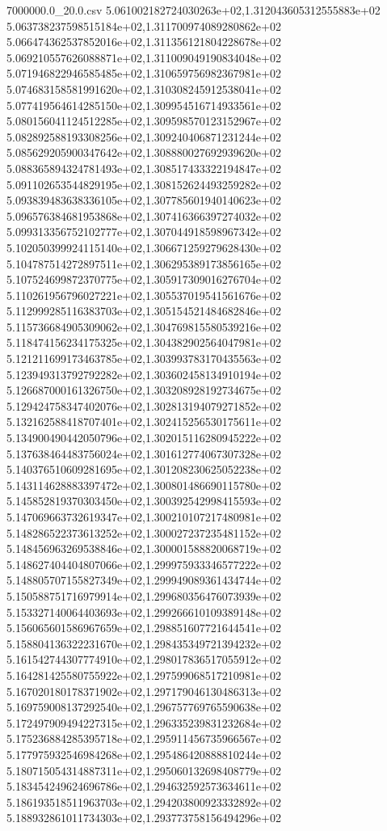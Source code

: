 \begin{filecontents*}{7000000.0_20.0.csv}
5.061002182724030263e+02,1.312043605312555883e+02
5.063738237598515184e+02,1.311700974089280862e+02
5.066474362537852016e+02,1.311356121804228678e+02
5.069210557626088871e+02,1.311009049190834048e+02
5.071946822946585485e+02,1.310659756982367981e+02
5.074683158581991620e+02,1.310308245912538041e+02
5.077419564614285150e+02,1.309954516714933561e+02
5.080156041124512285e+02,1.309598570123152967e+02
5.082892588193308256e+02,1.309240406871231244e+02
5.085629205900347642e+02,1.308880027692939620e+02
5.088365894324781493e+02,1.308517433322194847e+02
5.091102653544829195e+02,1.308152624493259282e+02
5.093839483638336105e+02,1.307785601940140623e+02
5.096576384681953868e+02,1.307416366397274032e+02
5.099313356752102777e+02,1.307044918598967342e+02
5.102050399924115140e+02,1.306671259279628430e+02
5.104787514272897511e+02,1.306295389173856165e+02
5.107524699872370775e+02,1.305917309016276704e+02
5.110261956796027221e+02,1.305537019541561676e+02
5.112999285116383703e+02,1.305154521484682846e+02
5.115736684905309062e+02,1.304769815580539216e+02
5.118474156234175325e+02,1.304382902564047981e+02
5.121211699173463785e+02,1.303993783170435563e+02
5.123949313792792282e+02,1.303602458134910194e+02
5.126687000161326750e+02,1.303208928192734675e+02
5.129424758347402076e+02,1.302813194079271852e+02
5.132162588418707401e+02,1.302415256530175611e+02
5.134900490442050796e+02,1.302015116280945222e+02
5.137638464483756024e+02,1.301612774067307328e+02
5.140376510609281695e+02,1.301208230625052238e+02
5.143114628883397472e+02,1.300801486690115780e+02
5.145852819370303450e+02,1.300392542998415593e+02
5.147069663732619347e+02,1.300210107217480981e+02
5.148286522373613252e+02,1.300027237235481152e+02
5.148456963269538846e+02,1.300001588820068719e+02
5.148627404404807066e+02,1.299975933346577222e+02
5.148805707155827349e+02,1.299949089361434744e+02
5.150588751716979914e+02,1.299680356476073939e+02
5.153327140064403693e+02,1.299266610109389148e+02
5.156065601586967659e+02,1.298851607721644541e+02
5.158804136322231670e+02,1.298435349721394232e+02
5.161542744307774910e+02,1.298017836517055912e+02
5.164281425580755922e+02,1.297599068517210981e+02
5.167020180178371902e+02,1.297179046130486313e+02
5.169759008137292540e+02,1.296757769765590638e+02
5.172497909494227315e+02,1.296335239831232684e+02
5.175236884285395718e+02,1.295911456735966567e+02
5.177975932546984268e+02,1.295486420888810244e+02
5.180715054314887311e+02,1.295060132698408779e+02
5.183454249624696786e+02,1.294632592573634611e+02
5.186193518511963703e+02,1.294203800923332892e+02
5.188932861011734303e+02,1.293773758156494296e+02

\end{filecontents*}
